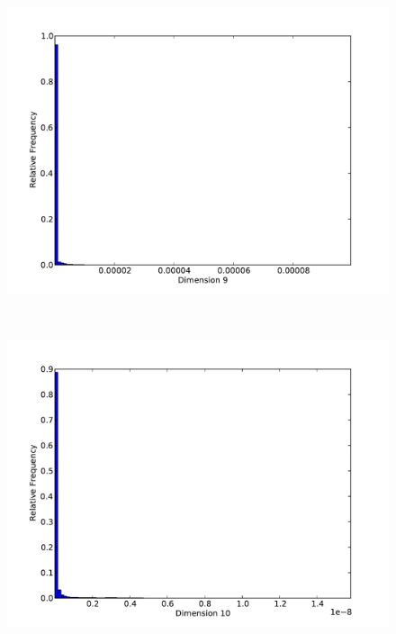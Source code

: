 \begin{figure}[h]
	\begin{center}
		\begin{subfloat}{%
			\includegraphics[scale=0.36]{figures/histograms/astrophysics_500000_8.pdf}
		}
		\end{subfloat}~
		\begin{subfloat}{%
			\includegraphics[scale=0.36]{figures/histograms/astrophysics_500000_9.pdf}
		}
		\end{subfloat}
	\end{center}
\end{figure}
